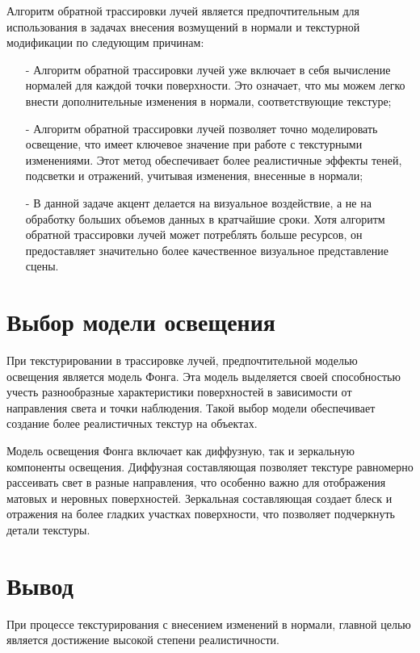 Алгоритм обратной трассировки лучей является предпочтительным для использования в задачах внесения возмущений в нормали и текстурной модификации по следующим причинам:
\begin{itemize}[label=\arabic*)]
	\item[-] Алгоритм обратной трассировки лучей уже включает в себя вычисление нормалей для каждой точки поверхности. Это означает, что мы можем легко внести дополнительные изменения в нормали, соответствующие текстуре;
	\item[-] Алгоритм обратной трассировки лучей позволяет точно моделировать освещение, что имеет ключевое значение при работе с текстурными изменениями. Этот метод обеспечивает более реалистичные эффекты теней, подсветки и отражений, учитывая изменения, внесенные в нормали;
	\item[-] В данной задаче акцент делается на визуальное воздействие, а не на обработку больших объемов данных в кратчайшие сроки. Хотя алгоритм обратной трассировки лучей может потреблять больше ресурсов, он предоставляет значительно более качественное визуальное представление сцены.
\end{itemize}

\section{Выбор модели освещения}

При текстурировании в трассировке лучей, предпочтительной моделью
освещения является модель Фонга. Эта модель выделяется своей способностью учесть разнообразные характеристики поверхностей в зависимости от направления света и точки наблюдения. Такой выбор модели обеспечивает создание более реалистичных текстур на объектах.

Модель освещения Фонга включает как диффузную, так и зеркальную компоненты освещения. Диффузная составляющая позволяет текстуре равномерно рассеивать свет в разные направления, что особенно важно для отображения матовых и неровных поверхностей. Зеркальная составляющая создает блеск и отражения на более гладких участках поверхности, что позволяет подчеркнуть детали текстуры.

\section*{Вывод}

При процессе текстурирования с внесением изменений в нормали, главной целью является достижение высокой степени реалистичности.

